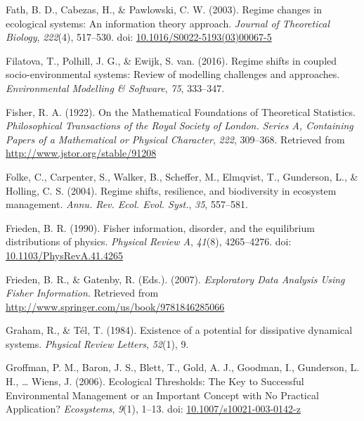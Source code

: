 \documentclass[12pt,twoside,openany]{reedthesis}
\begin{document}
\leavevmode\hypertarget{ref-fath_regime_2003}{}%
Fath, B. D., Cabezas, H., \& Pawlowski, C. W. (2003). Regime changes in ecological systems: An information theory approach. \emph{Journal of Theoretical Biology}, \emph{222}(4), 517--530. doi: \href{https://doi.org/10.1016/S0022-5193(03)00067-5}{10.1016/S0022-5193(03)00067-5}

\leavevmode\hypertarget{ref-filatova2016regime}{}%
Filatova, T., Polhill, J. G., \& Ewijk, S. van. (2016). Regime shifts in coupled socio-environmental systems: Review of modelling challenges and approaches. \emph{Environmental Modelling \& Software}, \emph{75}, 333--347.

\leavevmode\hypertarget{ref-fisher_mathematical_1922}{}%
Fisher, R. A. (1922). On the Mathematical Foundations of Theoretical Statistics. \emph{Philosophical Transactions of the Royal Society of London. Series A, Containing Papers of a Mathematical or Physical Character}, \emph{222}, 309--368. Retrieved from \url{http://www.jstor.org/stable/91208}

\leavevmode\hypertarget{ref-folke2004regime}{}%
Folke, C., Carpenter, S., Walker, B., Scheffer, M., Elmqvist, T., Gunderson, L., \& Holling, C. S. (2004). Regime shifts, resilience, and biodiversity in ecosystem management. \emph{Annu. Rev. Ecol. Evol. Syst.}, \emph{35}, 557--581.

\leavevmode\hypertarget{ref-frieden_fisher_1990}{}%
Frieden, B. R. (1990). Fisher information, disorder, and the equilibrium distributions of physics. \emph{Physical Review A}, \emph{41}(8), 4265--4276. doi: \href{https://doi.org/10.1103/PhysRevA.41.4265}{10.1103/PhysRevA.41.4265}

\leavevmode\hypertarget{ref-frieden_exploratory_2007}{}%
Frieden, B. R., \& Gatenby, R. (Eds.). (2007). \emph{Exploratory Data Analysis Using Fisher Information}. Retrieved from \url{http://www.springer.com/us/book/9781846285066}

\leavevmode\hypertarget{ref-graham1984existence}{}%
Graham, R., \& Tél, T. (1984). Existence of a potential for dissipative dynamical systems. \emph{Physical Review Letters}, \emph{52}(1), 9.

\leavevmode\hypertarget{ref-groffman_ecological_2006}{}%
Groffman, P. M., Baron, J. S., Blett, T., Gold, A. J., Goodman, I., Gunderson, L. H., \ldots{} Wiens, J. (2006). Ecological Thresholds: The Key to Successful Environmental Management or an Important Concept with No Practical Application? \emph{Ecosystems}, \emph{9}(1), 1--13. doi: \href{https://doi.org/10.1007/s10021-003-0142-z}{10.1007/s10021-003-0142-z}
\end{document}
